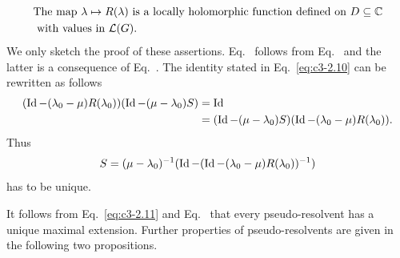 \begin{equation}\label{eq:c3-2.12}
	\begin{split}
	&\text{The map $\lambda \mapsto R(\lambda)$ is a locally holomorphic function defined on  $D \subseteq \mathbb{C} $}\\ 
	&\text{ with values in  $\mathcal{L}(G)$} .
	\end{split}
\end{equation}
We only sketch the proof of these assertions. Eq.~ follows from Eq.~ and the latter is a consequence of Eq.~.
The identity stated in Eq.~\eqref{eq:c3-2.10} can be rewritten as follows
\begin{align*}
(\operatorname{Id}-(\lambda_{0}-\mu)R(\lambda_{0}))(\operatorname{Id}-(\mu-\lambda_{0})S) & = \operatorname{Id} \\
& = (\operatorname{Id}-(\mu-\lambda_{0})S)(\operatorname{Id}-(\lambda_{0}-\mu)R(\lambda_{0})).
\end{align*}
Thus 
%
\[
	S = (\mu-\lambda_{0})^{-1}(\operatorname{Id} - (\operatorname{Id}-(\lambda_{0}-\mu)R(\lambda_{0}))^{-1})
\]
%
has to be unique.

It follows from Eq.~\eqref{eq:c3-2.11} and Eq.~ that every pseudo-resolvent has a unique maximal extension.
Further properties of pseudo-resolvents are given in the following two propositions.

